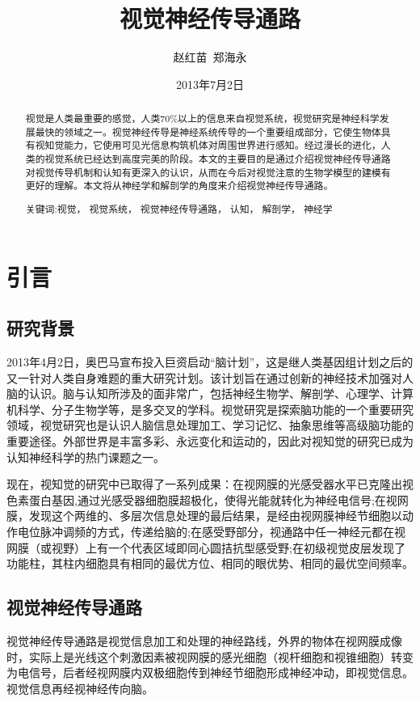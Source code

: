\documentclass[a4paper,12pt]{article}
\title{视觉神经传导通路}
\author{赵红苗\ 郑海永}
\date{2013年7月2日}
\begin{document}
\maketitle

\begin{abstract} 
视觉是人类最重要的感觉，人类70\%以上的信息来自视觉系统，视觉研究是神经科学发展最快的领域之一。视觉神经传导是神经系统传导的一个重要组成部分，它使生物体具有视知觉能力，它使用可见光信息构筑机体对周围世界进行感知。经过漫长的进化，人类的视觉系统已经达到高度完美的阶段。本文的主要目的是通过介绍视觉神经传导通路对视觉传导机制和认知有更深入的认识，从而在今后对视觉注意的生物学模型的建模有更好的理解。本文将从神经学和解剖学的角度来介绍视觉神经传导通路。


\begin{description}
\item[关键词:视觉，  视觉系统，  视觉神经传导通路，  认知，  解剖学， 神经学]
\end{description}
\end{abstract}

\newpage
\tableofcontents 
\newpage

\section{引言}
\subsection{研究背景}
2013年4月2日，奥巴马宣布投入巨资启动“脑计划”\cite{1:misc}，这是继人类基因组计划之后的又一针对人类自身难题的重大研究计划。该计划旨在通过创新的神经技术加强对人脑的认识。脑与认知\cite{6:article}所涉及的面非常广，包括神经生物学、解剖学、心理学、计算机科学、分子生物学等，是多交叉的学科。视觉研究是探索脑功能的一个重要研究领域，视觉研究也是认识人脑信息处理加工、学习记忆、抽象思维等高级脑功能的重要途径。外部世界是丰富多彩、永远变化和运动的，因此对视知觉的研究已成为认知神经科学的热门课题之一。


现在，视知觉的研究中已取得了一系列成果\cite{3:misc}：在视网膜的光感受器水平已克隆出视色素蛋白基因,通过光感受器细胞膜超极化，使得光能就转化为神经电信号;在视网膜，发现这个两维的、多层次信息处理的最后结果，是经由视网膜神经节细胞以动作电位脉冲调频的方式，传递给脑的;在感受野部分，视通路中任一神经元都在视网膜（或视野）上有一个代表区域即同心圆拮抗型感受野;在初级视觉皮层发现了功能柱，其柱内细胞具有相同的最优方位、相同的眼优势、相同的最优空间频率。


\subsection{视觉神经传导通路}
视觉神经传导通路是视觉信息加工和处理的神经路线，外界的物体在视网膜成像时，实际上是光线这个刺激因素被视网膜的感光细胞（视杆细胞和视锥细胞）转变为电信号，后者经视网膜内双极细胞传到神经节细胞形成神经冲动，即视觉信息。视觉信息再经视神经传向脑。
\end{document}
